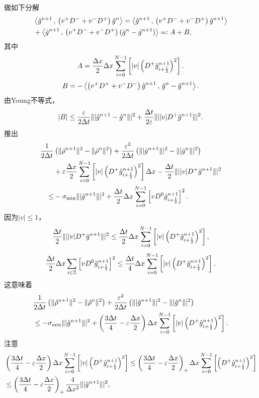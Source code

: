 做如下分解
\begin{equation*}
\begin{split}
& \left\langle\hat{g}^{n+1} \, , \, \left(v^+D^-+v^-D^+\right)\hat{g}^n\right\rangle
= \left\langle\hat{g}^{n+1} \, , \, \left(v^+D^-+v^-D^+\right)\hat{g}^{n+1}\right\rangle \\
&    + \left\langle\hat{g}^{n+1} \, , \, \left(v^+D^-+v^-D^+\right)(\hat{g}^n-\hat{g}^{n+1})\right\rangle =: A+B,
\end{split}
\end{equation*}
其中
$$
A = \frac{\Delta x}{2} \Delta x \sum_{i=0}^{N-1} \left[ |v|\left(D^+\hat{g}^{n+1}_{i+\frac{1}{2}}\right)^2 \right].
$$
$$
B= -\left\langle\left(v^+D^++v^-D^-\right)\hat{g}^{n+1} \, , \, \hat{g}^n-\hat{g}^{n+1}\right\rangle.
$$
由Young不等式，
$$
|B|\leq \frac{\varepsilon}{2\Delta t} \||\hat{g}^{n+1}-\hat{g}^n\||^2+\frac{\Delta t}{2\varepsilon}\|||v|D^+\hat{g}^{n+1}\||^2.
$$
推出
\begin{equation*}
\begin{split}
\frac{1}{2\Delta t} & \left(  \|\hat{\rho}^{n+1}\|^2-\|\hat{\rho}^n\|^2\right)
+ \frac{\varepsilon^2}{2\Delta t} \left( \||\hat{g}^{n+1}\||^2-\||\hat{g}^n\||^2 \right) \\
& + \varepsilon\frac{\Delta x}{2} \sum_{i=0}^{N-1}  \left[ |v|\left(D^+\hat{g}^{n+1}_{i+\frac{1}{2}}\right)^2 \right]\Delta x
  - \frac{\Delta t}{2}\|||v|D^+\hat{g}^{n+1}\||^2   \\
\leq & - \sigma_{\text{min}} \||\hat{g}^{n+1}\||^2 +\frac{\Delta t}{2}\Delta x \sum_{i=0}^{N-1} \left[ vD^0\hat{g}^{n+1}_{i+\frac{1}{2}} \right]^2.
\end{split}
\end{equation*}
因为$|v| \le 1$，
$$
\frac{\Delta t}{2}\|||v|D^+\hat{g}^{n+1}\||^2  \leq \frac{\Delta t}{2}\Delta x \sum_{i=0}^{N-1} \left[ |v|\left(D^+\hat{g}^{n+1}_{i+\frac{1}{2}}\right)^2 \right],
$$
$$
\frac{\Delta t}{2}\Delta x\sum_{i\in{\mathbb{Z}}}\left[ vD^0\hat{g}^{n+1}_{i+\frac{1}{2}} \right]^2 \leq \frac{\Delta t}{4}\Delta x \sum_{i=0}^{N-1} \left[ |v|\left(D^+\hat{g}^{n+1}_{i+\frac{1}{2}}\right)^2 \right].
$$
这意味着
\begin{equation*}
\begin{split}
& \frac{1}{2\Delta t} \left(  \|\hat{\rho}^{n+1}\|^2-\|\hat{\rho}^n\|^2\right)
+ \frac{\varepsilon^2}{2\Delta t} \left( \||\hat{g}^{n+1}\||^2-\||\hat{g}^n\||^2 \right)   \\
& \leq  - \sigma_{\text{min}} \||\hat{g}^{n+1}\||^2
+ \left(\frac{3\Delta t}{4}- \varepsilon\frac{\Delta x}{2}\right)
\Delta x \sum_{i=0}^{N-1} \left[ |v|\left(D^+\hat{g}^{n+1}_{i+\frac{1}{2}}\right)^2 \right].
\end{split}
\label{abc}
\end{equation*}
注意
\begin{equation*}\label{eq-enerfb}
\begin{split}
 & \left(\frac{3\Delta t}{4}- \varepsilon\frac{\Delta x}{2}\right)
\Delta x \sum_{i=0}^{N-1} \left[ |v|\left(D^+\hat{g}^{n+1}_{i+\frac{1}{2}}\right)^2 \right]
  \leq   \left(\frac{3\Delta t}{4}- \varepsilon\frac{\Delta x}{2}\right)_{+}
\Delta x  \sum_{i=0}^{N-1}\left[ \left(D^+\hat{g}^{n+1}_{i+\frac{1}{2}}\right)^2 \right] \\
& \leq   \left(\frac{3\Delta t}{4}- \varepsilon\frac{\Delta x}{2}\right)_{+}\frac{4}{\Delta x^2} \||\hat{g}^{n+1}\||^2,
\end{split}
\end{equation*}
